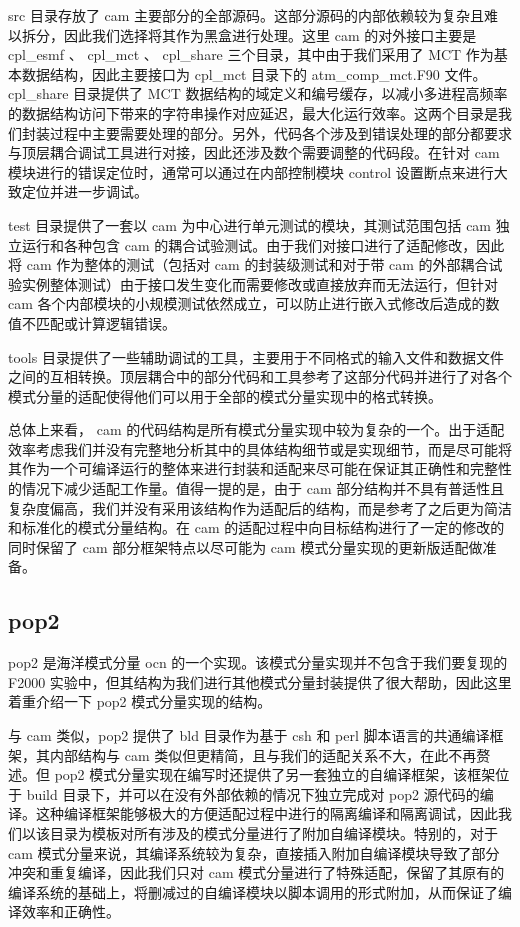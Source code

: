 src 目录存放了 cam 主要部分的全部源码。这部分源码的内部依赖较为复杂且难以拆分，因此我们选择将其作为黑盒进行处理。这里 cam 的对外接口主要是 cpl\_esmf 、 cpl\_mct 、 cpl\_share 三个目录，其中由于我们采用了 MCT 作为基本数据结构，因此主要接口为 cpl\_mct 目录下的 atm\_comp\_mct.F90 文件。 cpl\_share 目录提供了 MCT 数据结构的域定义和编号缓存，以减小多进程高频率的数据结构访问下带来的字符串操作对应延迟，最大化运行效率。这两个目录是我们封装过程中主要需要处理的部分。另外，代码各个涉及到错误处理的部分都要求与顶层耦合调试工具进行对接，因此还涉及数个需要调整的代码段。在针对 cam 模块进行的错误定位时，通常可以通过在内部控制模块 control 设置断点来进行大致定位并进一步调试。

test 目录提供了一套以 cam 为中心进行单元测试的模块，其测试范围包括 cam 独立运行和各种包含 cam 的耦合试验测试。由于我们对接口进行了适配修改，因此将 cam 作为整体的测试（包括对 cam 的封装级测试和对于带 cam 的外部耦合试验实例整体测试）由于接口发生变化而需要修改或直接放弃而无法运行，但针对 cam 各个内部模块的小规模测试依然成立，可以防止进行嵌入式修改后造成的数值不匹配或计算逻辑错误。

tools 目录提供了一些辅助调试的工具，主要用于不同格式的输入文件和数据文件之间的互相转换。顶层耦合中的部分代码和工具参考了这部分代码并进行了对各个模式分量的适配使得他们可以用于全部的模式分量实现中的格式转换。

总体上来看， cam 的代码结构是所有模式分量实现中较为复杂的一个。出于适配效率考虑我们并没有完整地分析其中的具体结构细节或是实现细节，而是尽可能将其作为一个可编译运行的整体来进行封装和适配来尽可能在保证其正确性和完整性的情况下减少适配工作量。值得一提的是，由于 cam 部分结构并不具有普适性且复杂度偏高，我们并没有采用该结构作为适配后的结构，而是参考了之后更为简洁和标准化的模式分量结构。在 cam 的适配过程中向目标结构进行了一定的修改的同时保留了 cam 部分框架特点以尽可能为 cam 模式分量实现的更新版适配做准备。

\subsection{pop2}

pop2 \cite{POP2doc} \cite{POP2faq}是海洋模式分量 ocn 的一个实现。该模式分量实现并不包含于我们要复现的 F2000 实验中，但其结构为我们进行其他模式分量封装提供了很大帮助，因此这里着重介绍一下 pop2 模式分量实现的结构。

与 cam 类似，pop2 提供了 bld 目录作为基于 csh 和 perl 脚本语言的共通编译框架，其内部结构与 cam 类似但更精简，且与我们的适配关系不大，在此不再赘述。但 pop2 模式分量实现在编写时还提供了另一套独立的自编译框架，该框架位于 build 目录下，并可以在没有外部依赖的情况下独立完成对 pop2 源代码的编译。这种编译框架能够极大的方便适配过程中进行的隔离编译和隔离调试，因此我们以该目录为模板对所有涉及的模式分量进行了附加自编译模块。特别的，对于 cam 模式分量来说，其编译系统较为复杂，直接插入附加自编译模块导致了部分冲突和重复编译，因此我们只对 cam 模式分量进行了特殊适配，保留了其原有的编译系统的基础上，将删减过的自编译模块以脚本调用的形式附加，从而保证了编译效率和正确性。

